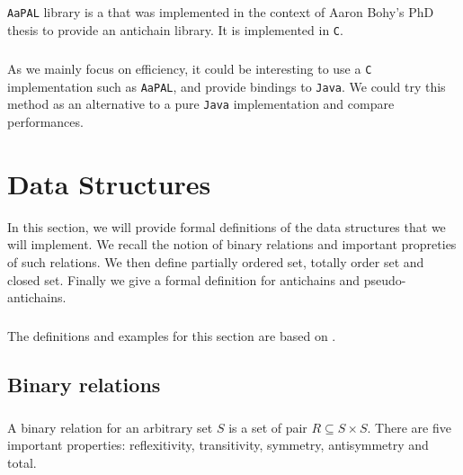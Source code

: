 \documentclass[letterpaper]{memoir}
\begin{document}
\paragraph{}

\texttt{AaPAL} library is a that was implemented in the context of
Aaron Bohy's PhD thesis \cite{bohy_phd}
to provide an antichain library. It is implemented in \texttt{C}.

\paragraph{}

As we mainly focus on efficiency, it could be interesting to use a \texttt{C}
implementation such as \texttt{AaPAL},
and provide bindings to \texttt{Java}. We could try
this method as an alternative to a pure \texttt{Java} implementation and
compare performances.

\chapter{Data Structures}

In this section, we will provide formal definitions of the data
structures that we will implement. We recall the notion of binary relations
and important propreties of such relations.
We then define partially ordered set, totally order set and closed set.
Finally we give a formal definition for antichains and pseudo-antichains.

\paragraph{}

The definitions and examples for this section are based on \cite{bohy_phd}.


\section{Binary relations}

\paragraph{}

A binary relation for an arbitrary set $S$ is
a set of pair $R \subseteq S \times S$.
There are five important properties: reflexitivity, transitivity,
symmetry, antisymmetry and total.

\paragraph{}
\end{document}
